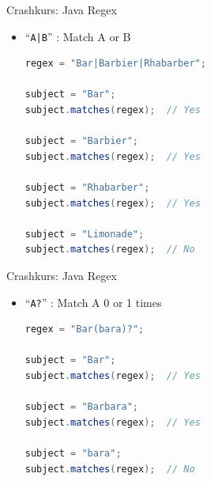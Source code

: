 \documentclass[18pt]{beamer}
\newcommand{\quotes}[1]{``#1''}
\begin{document}
\begin{frame}[fragile]{Crashkurs: Java Regex}
    \begin{itemize}
        \item \Large{\quotes{\alert{\texttt{A|B}}}} : Match A or B

        \vspace{.2in}

        \begin{lstlisting}[language=Java,basicstyle=\scriptsize]
regex = "Bar|Barbier|Rhabarber";

subject = "Bar";
subject.matches(regex);  // Yes

subject = "Barbier";
subject.matches(regex);  // Yes

subject = "Rhabarber";
subject.matches(regex);  // Yes

subject = "Limonade";
subject.matches(regex);  // No
        \end{lstlisting}

    \end{itemize}
\end{frame}

\begin{frame}[fragile]{Crashkurs: Java Regex}
    \begin{itemize}
        \item \Large{\quotes{\alert{\texttt{A?}}}} : Match A 0 or 1 times

        \vspace{.2in}

        \begin{lstlisting}[language=Java,basicstyle=\scriptsize]
regex = "Bar(bara)?";

subject = "Bar";
subject.matches(regex);  // Yes

subject = "Barbara";
subject.matches(regex);  // Yes

subject = "bara";
subject.matches(regex);  // No
        \end{lstlisting}

    \end{itemize}
\end{frame}
\end{document}
